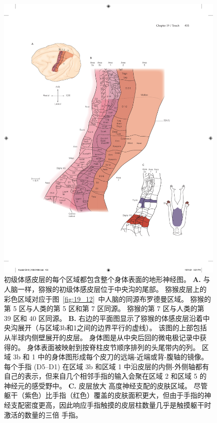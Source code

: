 \begin{figure}[htbp]
	\centering
	\includegraphics[width=0.95\linewidth]{chap19/fig_19_15}
	\caption{初级体感皮层的每个区域都包含整个身体表面的地形神经图\cite{nelson1980representations}。
		\textbf{A.} 与人脑一样，猕猴的初级体感皮层位于中央沟的尾部。
		猕猴皮层上的彩色区域对应于图~\ref{fig:19_12}~中人脑的同源布罗德曼区域。
		猕猴的第 5 区与人类的第 5 区和第 7 区同源。
		猕猴的第 7 区与人类的第 39 区和 40 区同源。
		\textbf{B.} 右边的平面图显示了猕猴的体感皮层沿着中央沟展开（与区域3b和1之间的边界平行的虚线）。
		该图的上部包括从半球内侧壁展开的皮层。
		身体图是从中央后回的微电极记录中获得的。
		身体表面被映射到按脊柱皮节顺序排列的头尾带内的列。
		区域 3b 和 1 中的身体图形成每个皮刀的远端-近端或背-腹轴的镜像。
		每个手指 (D5–D1) 在区域 3b 和区域 1 中沿皮层的内侧-外侧轴都有自己的表示，但来自几个相邻手指的输入会聚在区域 2 和区域 5 的神经元的感受野中。
		\textbf{C.} 皮层放大 高度神经支配的皮肤区域。
		尽管躯干（紫色）比手指（红色）覆盖的皮肤面积更大，但由于手指的神经支配密度更高，因此响应手指触摸的皮层柱数量几乎是触摸躯干时激活的数量的三倍 手指。}
	\label{fig:19_15}
\end{figure}


